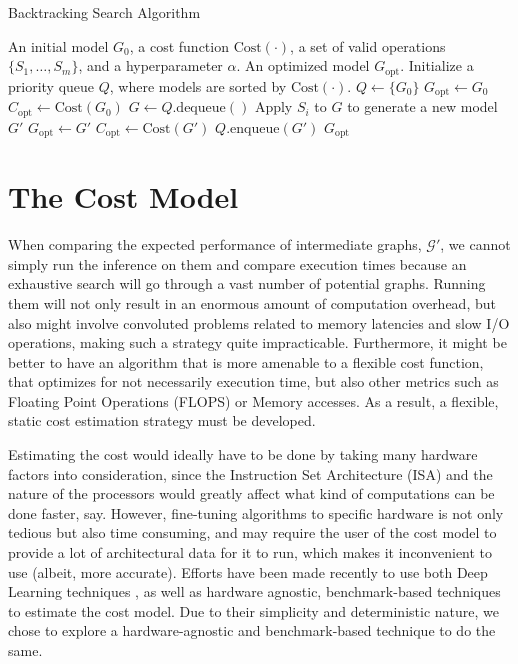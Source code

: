 \documentclass[12pt,a4paper,twoside,openright,bibliography=totocnumbered]{report}
\begin{document}
\begin{algorithm}[H]
\caption{Backtracking Search Algorithm}
\label{alg:backtracking}
\begin{algorithmic}[1]
\REQUIRE An initial model $G_0$, a cost function $\text{Cost}(\cdot)$, a set of valid operations $\{S_1, \dots, S_m\}$, and a hyperparameter $\alpha$.
\ENSURE An optimized model $G_{\text{opt}}$.
\STATE Initialize a priority queue $Q$, where models are sorted by $\text{Cost}(\cdot)$.
\STATE $Q \gets \{G_0\}$
\STATE $G_{\text{opt}} \gets G_0$
\STATE $C_{\text{opt}} \gets \text{Cost}(G_0)$
    \STATE $G \gets Q.\text{dequeue}()$
        \STATE Apply $S_i$ to $G$ to generate a new model $G'$
            \STATE $G_{\text{opt}} \gets G'$
            \STATE $C_{\text{opt}} \gets \text{Cost}(G')$
        \ENDIF
            \STATE $Q.\text{enqueue}(G')$
        \ENDIF
    \ENDFOR
\ENDWHILE
\RETURN $G_{\text{opt}}$
\end{algorithmic}
\end{algorithm}

\section{The Cost Model}
		
		
	When comparing the expected performance of intermediate graphs, $\mathcal{G'}$, we cannot simply run the inference on them and compare execution times because an exhaustive search will go through a vast number of potential graphs. Running them will not only result in an enormous amount of computation overhead, but also might involve convoluted problems related to memory latencies and slow I/O operations, making such a strategy quite impracticable. Furthermore, it might be better to have an algorithm that is more amenable to a flexible cost function, that optimizes for not necessarily execution time, but also other metrics such as Floating Point Operations (FLOPS) or Memory accesses. As a result, a flexible, static cost estimation strategy must be developed. 
	
    Estimating the cost would ideally have to be done by taking many hardware factors into consideration, since the Instruction Set Architecture (ISA) and the nature of the processors would greatly affect what kind of computations can be done faster, say. However, fine-tuning algorithms to specific hardware is not only tedious but also time consuming, and may require the user of the cost model to provide a lot of architectural data for it to run, which makes it inconvenient to use (albeit, more accurate). Efforts have been made recently to use both Deep Learning techniques \cite{wang2020perfnet}, as well as hardware agnostic, benchmark-based techniques \cite{qi2017paleo}\cite{wess2020annette}\cite{osterwind2022hardware} to estimate the cost model. Due to their simplicity and deterministic nature, we chose to explore a hardware-agnostic and benchmark-based technique to do the same.
\end{document}
